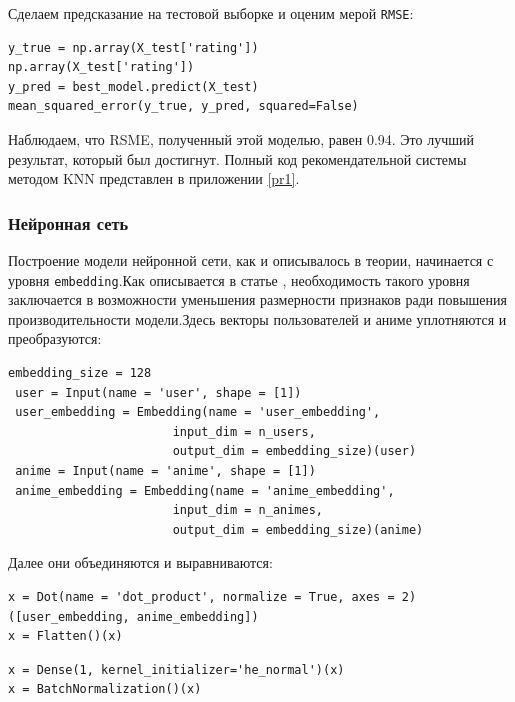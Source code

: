 \documentclass[bachelor, och, diploma]{SCWorks}
\begin{document}
Сделаем предсказание на тестовой выборке и оценим мерой \verb|RMSE|:

\begin{verbatim}
y_true = np.array(X_test['rating'])
np.array(X_test['rating'])
y_pred = best_model.predict(X_test)
mean_squared_error(y_true, y_pred, squared=False)
\end{verbatim}

Наблюдаем, что RSME, полученный этой моделью, равен 0.94. Это лучший результат, который был достигнут.
Полный код рекомендательной системы методом KNN представлен в приложении \ref{pr1}.

\subsubsection{Нейронная сеть}

Построение модели нейронной сети, как и описывалось в теории, начинается с уровня \verb|embedding|.Как описывается в статье \cite{samodin2020}, необходимость 
такого уровня заключается в возможности уменьшения размерности признаков ради повышения производительности модели.Здесь векторы пользователей и аниме уплотняются и преобразуются: 

\begin{verbatim}
embedding_size = 128
 user = Input(name = 'user', shape = [1])
 user_embedding = Embedding(name = 'user_embedding',
                       input_dim = n_users, 
                       output_dim = embedding_size)(user)
 anime = Input(name = 'anime', shape = [1])
 anime_embedding = Embedding(name = 'anime_embedding',
                       input_dim = n_animes, 
                       output_dim = embedding_size)(anime)

\end{verbatim}

Далее они объединяются и выравниваются: 

\begin{verbatim}
x = Dot(name = 'dot_product', normalize = True, axes = 2)([user_embedding, anime_embedding])
x = Flatten()(x)
\end{verbatim}

\begin{verbatim}
x = Dense(1, kernel_initializer='he_normal')(x)
x = BatchNormalization()(x)
\end{verbatim}
\end{document}
